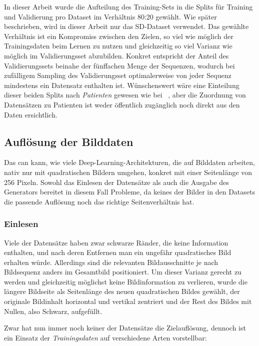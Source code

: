 In dieser Arbeit wurde die Aufteilung des Training-Sets in die Splits für Training und Validierung pro Dataset im Verhältnis 80:20 gewählt.
Wie später beschrieben, wird in dieser Arbeit nur das SD-Dataset verwendet.
Das gewählte Verhältnis ist ein Kompromiss zwischen den Zielen, so viel wie möglich der Trainingsdaten beim Lernen zu nutzen und gleichzeitig so viel Varianz wie möglich im Validierungsset abzubilden.
Konkret entspricht der Anteil des Validierungssets beinahe der fünffachen Menge der Sequenzen, wodurch bei zufälligem Sampling des Validierungsset optimalerweise von jeder Sequenz mindestens ein Datensatz enthalten ist.
Wünschenswert wäre eine Einteilung dieser beiden Splits nach \emph{Patienten} gewesen wie bei \citeauthor{Vazquez.2017}~\cite{Vazquez.2017}, aber die Zuordnung von Datensätzen zu Patienten ist weder öffentlich zugänglich noch direkt aus den Daten ersichtlich.



\subsection{Auflösung der Bilddaten}

Das \gls{can} kann, wie viele Deep-Learning-Architekturen, die auf Bilddaten arbeiten, nativ nur mit quadratischen Bildern umgehen, konkret mit einer Seitenlänge von 256 Pixeln.
Sowohl das Einlesen der Datensätze als auch die Ausgabe des Generators bereitet in diesem Fall Probleme, da keines der Bilder in den Datasets die passende Auflösung noch das richtige Seitenverhältnis hat.



\subsubsection{Einlesen}

Viele der Datensätze haben zwar schwarze Ränder, die keine Information enthalten, und nach deren Entfernen man ein ungefähr quadratisches Bild erhalten würde.
Allerdings sind die relevanten Bildausschnitte je nach Bildsequenz anders im Gesamtbild positioniert.
Um dieser Varianz gerecht zu werden und gleichzeitig möglichst keine Bildinformation zu verlieren, wurde die längere Bildseite als Seitenlänge des neuen quadratischen Bildes gewählt, der originale Bildinhalt horizontal und vertikal zentriert und der Rest des Bildes mit Nullen, also Schwarz, aufgefüllt.

Zwar hat nun immer noch keiner der Datensätze die Zielauflösung, dennoch ist ein Einsatz der \emph{Trainingsdaten} auf verschiedene Arten vorstellbar:

